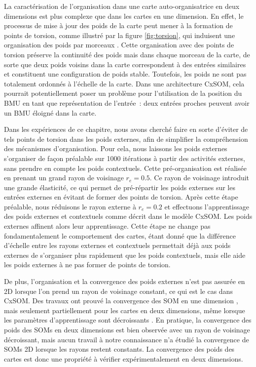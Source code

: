 \documentclass[../main]{subfiles}
\begin{document}
La caractérisation de l'organisation dans une carte auto-organisatrice en deux dimensions est plus complexe que dans les cartes en une dimension. En effet, le processus de mise à jour des poids de la carte peut mener à la formation de points de torsion, comme illustré par la figure \ref{fig:torsion}, qui induisent une organisation des poids \og par morceaux \fg{}. Cette organisation avec des points de torsion préserve la continuité des poids mais dans chaque morceau de la carte, de sorte que deux poids voisins dans la carte correspondent à des entrées similaires et constituent une configuration de poids stable. Toutefois, les poids ne sont pas totalement ordonnés à l'échelle de la carte. Dans une architecture CxSOM, cela pourrait potentiellement poser un problème pour l'utilisation de la position du BMU en tant que représentation de l'entrée~: deux entrées proches peuvent avoir un BMU éloigné dans la carte.

Dans les expériences de ce chapitre, nous avons cherché faire en sorte d'éviter de tels points de torsion dans les poids externes, afin de simplifier la compréhension des mécanismes d'organisation.
Pour cela, nous laissons les poids externes s'organiser de façon préalable sur 1000 itérations à partir des activités externes, sans prendre en compte les poids contextuels. Cette pré-organisation est réalisée en prenant un grand rayon de voisinage $r_e = 0.5$.
Ce rayon de voisinage introduit une grande élasticité, ce qui permet de pré-répartir les poids externes sur les entrées externes en évitant de former des points de torsion. Après cette étape préalable, nous réduisons le rayon externe à $r_e = 0.2$ et effectuons l'apprentissage des poids externes et contextuels comme décrit dans le modèle CxSOM. Les poids externes affinent alors leur apprentissage. Cette étape ne change pas fondamentalement le comportement des cartes, étant donné que la différence d'échelle entre les rayons externes et contextuels permettait déjà aux poids externes de s'organiser plus rapidement que les poids contextuels, mais elle aide les poids externes à ne pas former de points de torsion.

De plus, l'organisation et la convergence des poids externes n'est pas assurée en 2D lorsque l'on prend un rayon de voisinage constant, ce qui est le cas dans CxSOM.
Des travaux ont prouvé la convergence des SOM en une dimension \cite{Cottrell1998TheoreticalAO}, mais seulement partiellement pour les cartes en deux dimensions, même lorsque les paramètres d'apprentissage sont décroissants \cite{flanagan_self-organisation_1996}. En pratique, la convergence des poids des SOMs en deux dimensions est bien observée avec un rayon de voisinage décroissant, mais aucun travail à notre connaissance n'a étudié la convergence de SOMs 2D lorsque les rayons restent constants. La convergence des poids des cartes est donc une propriété à vérifier expérimentalement en deux dimensions.
\end{document}
